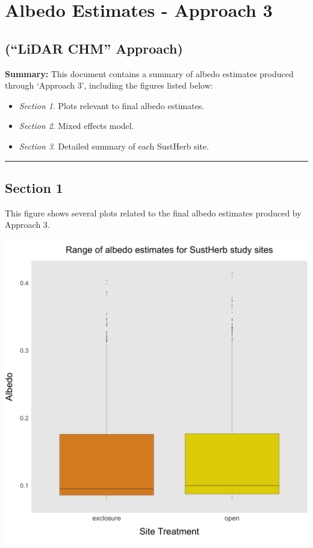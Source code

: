 \documentclass[]{article}
\author{}
\date{\vspace{-2.5em}}
\providecommand{\tightlist}{%
  \setlength{\itemsep}{0pt}\setlength{\parskip}{0pt}}
\begin{document}
\section{Albedo Estimates - Approach
3}\label{albedo-estimates---approach-3}

\subsection{\texorpdfstring{(``LiDAR CHM''
Approach)}{(LiDAR CHM Approach)}}\label{lidar-chm-approach}

\textbf{Summary:} This document contains a summary of albedo estimates
produced through `Approach 3', including the figures listed below:

\begin{itemize}
\tightlist
\item
  \emph{Section 1}. Plots relevant to final albedo estimates.
\item
  \emph{Section 2}. Mixed effects model.
\item
  \emph{Section 3}. Detailed summary of each SustHerb site.
\end{itemize}

\begin{center}\rule{0.5\linewidth}{0.5pt}\end{center}

\subsection{Section 1}\label{section-1}

This figure shows several plots related to the final albedo estimates
produced by Approach 3.

\begin{center}\includegraphics[width=0.8\linewidth]{../../../Approach_3/Output/Albedo_Estimates/albedo_boxplot_approach_3} \end{center}
\end{document}
